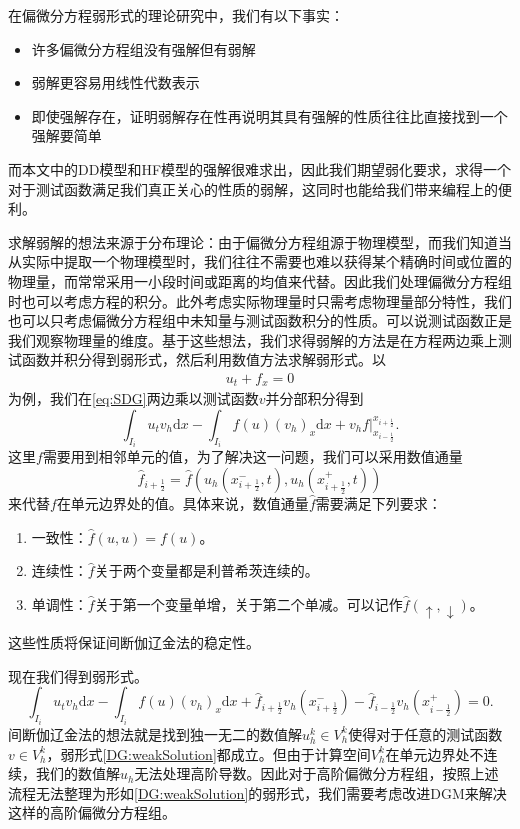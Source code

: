 在偏微分方程弱形式的理论研究中，我们有以下事实\cite{sullivan2020brief}：
\begin{itemize}
    \item 许多偏微分方程组没有强解但有弱解
    \item 弱解更容易用线性代数表示
    \item 即使强解存在，证明弱解存在性再说明其具有强解的性质往往比直接找到一个强解要简单
\end{itemize}
而本文中的DD模型和HF模型的强解很难求出，因此我们期望弱化要求，求得一个对于测试函数满足我们真正关心的性质的弱解，这同时也能给我们带来编程上的便利。

求解弱解的想法来源于分布理论：由于偏微分方程组源于物理模型，而我们知道当从实际中提取一个物理模型时，我们往往不需要也难以获得某个精确时间或位置的物理量，而常常采用一小段时间或距离的均值来代替。因此我们处理偏微分方程组时也可以考虑方程的积分。此外考虑实际物理量时只需考虑物理量部分特性，我们也可以只考虑偏微分方程组中未知量与测试函数积分的性质。可以说测试函数正是我们观察物理量的维度。基于这些想法，我们求得弱解的方法是在方程两边乘上测试函数并积分得到弱形式，然后利用数值方法求解弱形式。以
\begin{align}
    u_t + f_x = 0\label{eq:SDG}
\end{align}
为例，我们在\eqref{eq:SDG}两边乘以测试函数$v$并分部积分得到
\begin{equation}
    \int_{I_i}u_t v_h\mathrm{d}x - \int_{I_i}f(u)(v_h)_x\mathrm{d}x+v_hf\bigg|^{x_{i+\frac{1}{2}}}_{x_{i-\frac{1}{2}}}.
\end{equation}
这里$f$需要用到相邻单元的值，为了解决这一问题，我们可以采用数值通量
\begin{equation*}
    \hat{f}_{i+\frac{1}{2}}=\hat{f}(u_h(x^-_{i+\frac{1}{2}},t),u_h(x^+_{i+\frac{1}{2}},t))
\end{equation*}
来代替$f$在单元边界处的值。具体来说，数值通量$\hat{f}$需要满足下列要求：
\begin{enumerate}
    \item 一致性：$\hat{f}(u,u)=f(u)$。
    \item 连续性：$\hat{f}$关于两个变量都是利普希茨连续的。
    \item 单调性：$\hat{f}$关于第一个变量单增，关于第二个单减。可以记作$\hat{f}(\uparrow,\downarrow)$。
\end{enumerate}
这些性质将保证间断伽辽金法的稳定性。

现在我们得到弱形式。
\begin{equation}
    \int_{I_i}u_t v_h\mathrm{d}x - \int_{I_i}f(u)(v_h)_x\mathrm{d}x+\hat{f}_{i+\frac{1}{2}}v_h(x^-_{i+\frac{1}{2}})-\hat{f}_{i-\frac{1}{2}}v_h(x^+_{i-\frac{1}{2}}) = 0. \label{DG:weakSolution}
\end{equation}
间断伽辽金法的想法就是找到独一无二的数值解$u_h^k\in V_h^k$使得对于任意的测试函数$v \in V_h^k$，弱形式\eqref{DG:weakSolution}都成立。但由于计算空间$V_h^k$在单元边界处不连续，我们的数值解$u_h$无法处理高阶导数。因此对于高阶偏微分方程组，按照上述流程无法整理为形如\eqref{DG:weakSolution}的弱形式，我们需要考虑改进DGM来解决这样的高阶偏微分方程组。

